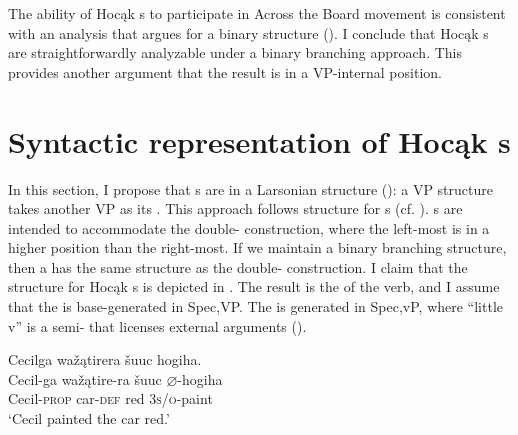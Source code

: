 \documentclass[output=paper]{LSP/langsci}
\begin{document}
The ability of Hocąk s to participate in Across the Board movement is consistent with an analysis that argues for a binary structure (\citealt{Bowers1997}). I conclude that Hocąk s are straightforwardly analyzable under a binary branching approach. This provides another argument that the result is in a VP-internal position.
 
\section{Syntactic representation of Hocąk s}\label{sec:rosen:4}
 
In this section, I propose that s are in a Larsonian  structure (\citealt{Larson1988}): a VP structure takes another VP as its . This approach follows  structure for  s (cf. \citealt{Hoekstra1988,Carrier1992,LevinRappaportHovav1995}).  s are intended to accommodate the double- construction, where the left-most  is in a higher position than the right-most. If we maintain a binary branching structure, then a  has the same structure as the double- construction. I claim that the structure for Hocąk s is depicted in . The result  is the  of the verb, and I assume that the  is base-generated in Spec,VP. The  is generated in Spec,vP, where ``little v'' is a semi- that licenses external arguments (\citealt{Chomsky1995}).

\begin{exe}
\ex\label{ex:rosen:27}
\begin{xlist}

\ex \glll Cecilga wažątirera šuuc hogiha. \\
Cecil-ga  wažątire-ra šuuc {$\varnothing$}-hogiha \\
Cecil-\textsc{prop} car-\textsc{def} red \textsc{3s/o}-paint\\
\glt `Cecil painted the car red.'

\ex 
{\hspace{1em}}\newline
{}
\end{xlist}
\end{exe}
\end{document}
